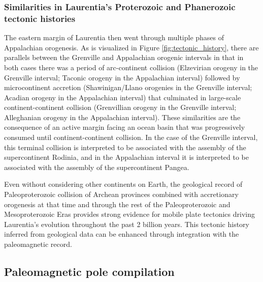 \documentclass[twocolumn, switch]{article} %
\begin{document}
\subsubsection{Similarities in Laurentia's Proterozoic and Phanerozoic tectonic histories}

The eastern margin of Laurentia then went through multiple phases of Appalachian orogenesis. As is visualized in Figure \ref{fig:tectonic_history}, there are parallels between the Grenville and Appalachian orogenic intervals in that in both cases there was a period of arc-continent collision (Elzevirian orogeny in the Grenville interval; Taconic orogeny in the Appalachian interval) followed by microcontinent accretion (Shawinigan/Llano orogenies in the Grenville interval; Acadian orogeny in the Appalachian interval) that culminated in large-scale continent-continent collision (Grenvillian orogeny in the Grenville interval; Alleghanian orogeny in the Appalachian interval). These similarities are the consequence of an active margin facing an ocean basin that was progressively consumed until continent-continent collision. In the case of the Grenville interval, this terminal collision is interpreted to be associated with the assembly of the supercontinent Rodinia, and in the Appalachian interval it is interpreted to be associated with the assembly of the supercontinent Pangea.

Even without considering other continents on Earth, the geological record of Paleoproterozoic collision of Archean provinces combined with accretionary orogenesis at that time and through the rest of the Paleoproterozoic and Mesoproterozoic Eras provides strong evidence for mobile plate tectonics driving Laurentia's evolution throughout the past 2 billion years. This tectonic history inferred from geological data can be enhanced through integration with the paleomagnetic record.

\subsection{Paleomagnetic pole compilation}
\end{document}
